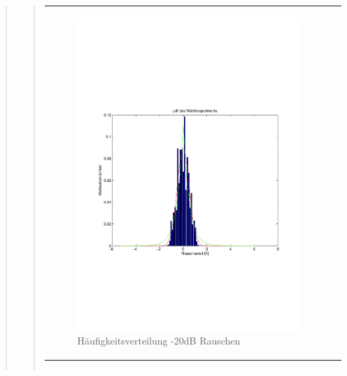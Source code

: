 \begin{quote}
\begin{quote}
\begin{center}
\begin{tabular}{ll}
                   \begin{minipage}{0.6\textwidth}
                       \begin{figure}[H] 
                           \includegraphics[scale=0.49, trim = 10mm 65mm 10mm 85mm, clip]{./Bilder/PDFRauschen-20dB}
                           \caption{Häufigkeitsverteilung -20dB Rauschen}
                       \end{figure}
        
                   \end{minipage}
        
               \end{tabular}
               \end{center}
        
                       \begin{center}
               \begin{tabular}{ll}
        

\end{tabular}
\end{center}
\end{quote}
\end{quote}
